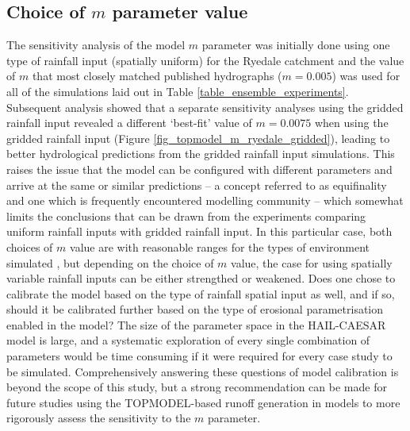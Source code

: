 \subsection{Choice of \(m\) parameter value}
The sensitivity analysis of the model \(m\) parameter was initially done using one type of rainfall input (spatially uniform) for the Ryedale catchment and the value of \(m\) that most closely matched published hydrographs (\(m = 0.005\)) was used for all of the simulations laid out in Table \ref{table_ensemble_experiments}. Subsequent analysis showed that a separate sensitivity analyses using the gridded rainfall input revealed a different `best-fit' value of \(m=0.0075\) when using the gridded rainfall input (Figure \ref{fig_topmodel_m_ryedale_gridded}), leading to better hydrological predictions from the gridded rainfall input simulations. This raises the issue that the model can be configured with different parameters and arrive at the same or similar predictions -- a concept referred to as equifinality and one which is frequently encountered modelling community \citep{beven1993prophecy,beven2001equifinality,ebel2006physics} -- which somewhat limits the conclusions that can be drawn from the experiments comparing uniform rainfall inputs with gridded rainfall input. In this particular case, both choices of \(m\) value are with reasonable ranges for the types of environment simulated \citep{beven1984testing}, but depending on the choice of \(m\) value, the case for using spatially variable rainfall inputs can be either strengthed or weakened. Does one chose to calibrate the model based on the type of rainfall spatial input as well, and if so, should it be calibrated further based on the type of erosional parametrisation enabled in the model? The size of the parameter space in the HAIL-CAESAR model is large, and a systematic exploration of every single combination of parameters would be time consuming if it were required for every case study to be simulated. Comprehensively answering these questions of model calibration is beyond the scope of this study, but a strong recommendation can be made for future studies using the TOPMODEL-based runoff generation in models to more rigorously assess the sensitivity to the \(m\) parameter.

